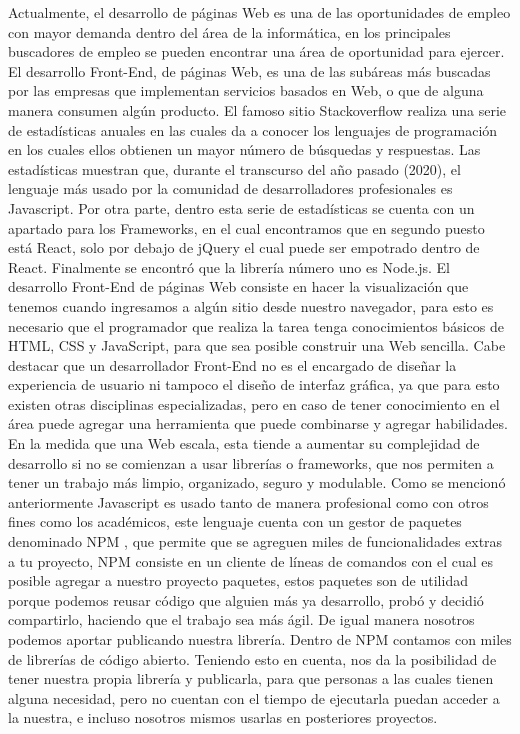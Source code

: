 Actualmente, el desarrollo de páginas Web es una de las oportunidades de empleo con mayor demanda dentro del área de la informática, en los principales buscadores de empleo  \cite{work} se pueden encontrar una área de oportunidad para ejercer. El desarrollo Front-End, de páginas Web, es una de las subáreas más buscadas por las empresas que implementan servicios basados en Web, o que de alguna manera consumen algún producto. 
El famoso sitio Stackoverflow  \cite{stackOverflow}realiza una serie de estadísticas anuales en las cuales da a conocer los lenguajes de programación en los cuales ellos obtienen un mayor número de búsquedas y respuestas. Las estadísticas muestran que, durante el transcurso del año pasado (2020), el lenguaje más usado por la comunidad de desarrolladores profesionales es Javascript. 
Por otra parte, dentro esta serie de estadísticas se cuenta con un apartado para los Frameworks, en el cual encontramos que en segundo puesto está React, solo por debajo de jQuery el cual puede ser empotrado dentro de React.  Finalmente se encontró que la librería número uno es Node.js. 
El desarrollo Front-End  \cite{frontEnd}de páginas Web consiste en hacer la visualización que tenemos cuando ingresamos a algún sitio desde nuestro navegador, para esto es necesario que el programador que realiza la tarea tenga conocimientos básicos de HTML, CSS y JavaScript, para que sea posible construir una Web sencilla. Cabe destacar que un desarrollador Front-End no es el encargado de diseñar la experiencia de usuario ni tampoco el diseño de interfaz gráfica, ya que para esto existen otras disciplinas especializadas, pero en caso de tener conocimiento en el área puede agregar una herramienta que puede combinarse y agregar habilidades.
\newline
En la medida que una Web escala, esta tiende a aumentar su complejidad de desarrollo si no se comienzan a usar librerías o frameworks, que nos permiten a tener un trabajo más limpio, organizado, seguro y modulable. 
Como se mencionó anteriormente Javascript es usado tanto de manera profesional como con otros fines como los académicos, este lenguaje cuenta con un gestor de paquetes denominado NPM  \cite{npm},  que permite que se agreguen miles de funcionalidades extras a tu proyecto, NPM consiste en un cliente de líneas de comandos con el cual es posible agregar a nuestro proyecto paquetes, estos paquetes son de utilidad porque podemos reusar código que alguien más ya desarrollo, probó y decidió compartirlo, haciendo que el trabajo sea más ágil.  De igual manera nosotros podemos aportar publicando nuestra librería. Dentro de NPM contamos con miles de librerías de código abierto.  
Teniendo esto en cuenta, nos da la posibilidad de tener nuestra propia librería y publicarla, para que personas a las cuales tienen alguna necesidad, pero no cuentan con el tiempo de ejecutarla puedan acceder a la nuestra, e incluso nosotros mismos usarlas en posteriores proyectos. 

